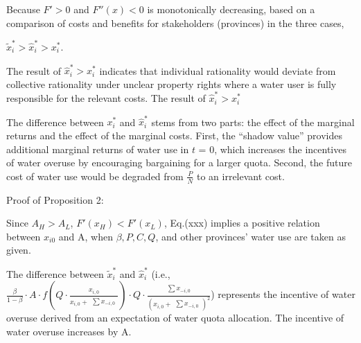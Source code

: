 \documentclass[preprint, 12pt]{elsarticle}
\begin{document}
Because $F'>0$ and $F''(x)<0$ is monotonically decreasing, based on a comparison of costs and benefits for stakeholders (provinces) in the three cases,

$\widetilde x_i^*>\hat x_i^*>x_i^*$.

The result of $\hat x_i^*>x_i^*$ indicates that individual rationality would deviate from collective rationality under unclear property rights where a water user is fully responsible for the relevant costs. The result of $\hat x_i^*>x_i^*$

The difference between $ x_i^*$ and $\hat x_i^*$ stems from two parts: the effect of the marginal returns and the effect of the marginal costs. First, the ``shadow value'' provides additional marginal returns of water use in $t$ = 0, which increases the incentives of water overuse by encouraging bargaining for a larger quota. Second, the future cost of water use would be degraded from $\frac{P}{N}$ to an irrelevant cost.

Proof of Proposition 2:

Since $A_H>A_L$, $F'(x_H)<F'(x_L)$,
Eq.(xxx) implies a positive relation between $x_{i0}$ and A, when $\beta, P, C, Q$, and other provinces' water use are taken as given.

The difference between $\widetilde x_i^*$ and $\hat x_i^*$ (i.e., $\frac{\beta}{1-\beta} \cdot A \cdot f(Q \cdot \frac{x_{i,0}}{x_{i,0} + \begin{matrix} \sum x_{-i,0} \end{matrix}}) \cdot Q \cdot \frac{\begin{matrix} \sum x_{-i,0} \end{matrix}}{(x_{i,0} + \begin{matrix} \sum x_{-i,0} \end{matrix})^2}$) represents the incentive of water overuse derived from an expectation of water quota allocation. The incentive of water overuse increases by A.
\end{document}
